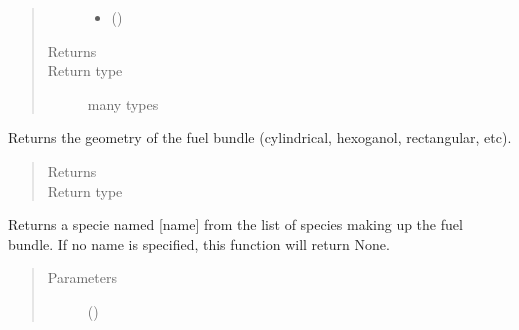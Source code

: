 \documentclass[letterpaper,10pt,openany,oneside,english]{sphinxmanual}
\begin{document}
\begin{fulllineitems}
\begin{fulllineitems}
\begin{quote}
\begin{description}
\begin{itemize}
\item {} 
 () \textendash{} 

\end{itemize}

\item[{Returns}] \leavevmode


\item[{Return type}] \leavevmode
many types

\end{description}\end{quote}

\end{fulllineitems}


\begin{fulllineitems}
\label{\detokenize{support_rst/fuel_segment:fuel_segment.FuelSegment.get_geometry}}
Returns the geometry of the fuel bundle (cylindrical, hexoganol,
rectangular, etc).
\begin{quote}\begin{description}
\item[{Returns}] \leavevmode
{}

\item[{Return type}] \leavevmode
{}

\end{description}\end{quote}

\end{fulllineitems}


\begin{fulllineitems}
\label{\detokenize{support_rst/fuel_segment:fuel_segment.FuelSegment.get_specie}}
Returns a specie named {[}name{]} from the list of species making up the
fuel bundle. If no name is specified, this function will return None.
\begin{quote}\begin{description}
\item[{Parameters}] \leavevmode
{} () \textendash{} 


\end{description}
\end{quote}
\end{fulllineitems}
\end{fulllineitems}
\end{document}
